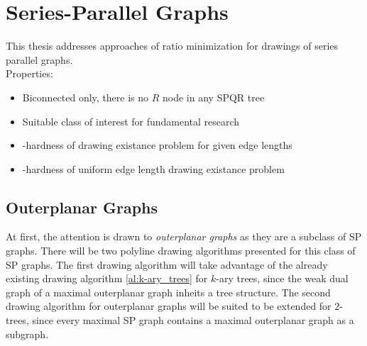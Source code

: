 \section{Series-Parallel Graphs}

This thesis addresses approaches of ratio minimization for drawings of series parallel graphs. \\
Properties:
\begin{itemize}
	\item Biconnected only, there is no $R$ node in any SPQR tree
	\item Suitable class of interest for fundamental research
	\item \NP-hardness of drawing existance problem for given edge lengths
	\item \NP-hardness of uniform edge length drawing existance problem
\end{itemize}

\subsection{Outerplanar Graphs}

At first, the attention is drawn to \emph{outerplanar graphs} as they are a subclass of SP graphs. There will be two polyline drawing algorithms presented for this class of SP graphs. The first drawing algorithm will take advantage of the already existing drawing algorithm \ref{al:k-ary_trees} for $k$-ary trees, since the weak dual graph of a maximal outerplanar graph inheits a tree structure. The second drawing algorithm for outerplanar graphs will be suited to be extended for $2$-trees, since every maximal SP graph contains a maximal outerplanar graph as a subgraph.

